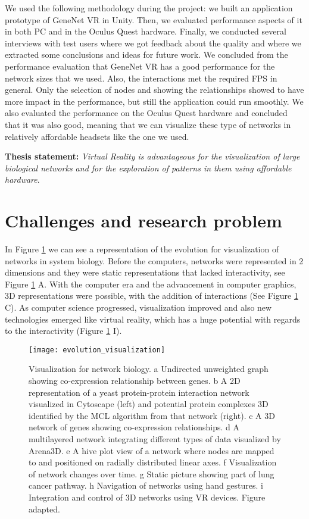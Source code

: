 We used the following methodology during the project: we built an application prototype of GeneNet VR in Unity. Then, we evaluated performance aspects of it in both PC and in the Oculus Quest hardware. Finally, we conducted several interviews with test users where we got feedback about the quality and where we extracted some conclusions and ideas for future work. We concluded from the performance evaluation that GeneNet VR has a good performance for the network sizes that we used. Also, the interactions met the required FPS in general. Only the selection of nodes and showing the relationships showed to have more impact in the performance, but still the application could run smoothly. We also evaluated the performance on the Oculus Quest hardware and concluded that it was also good, meaning that we can visualize these type of networks in relatively affordable headsets like the one we used.

\textbf{Thesis statement: } \emph{Virtual Reality is advantageous for the visualization of large biological networks and for the exploration of patterns in them using affordable hardware}.

\section{Challenges and research problem}
In Figure \ref{fig:network_biology_evolution} we can see a representation of the evolution for visualization of networks in system biology. Before the computers, networks were represented in 2 dimensions and they were static representations that lacked interactivity, see Figure \ref{fig:network_biology_evolution} A. With the computer era and the advancement in computer graphics, 3D representations were possible, with the addition of interactions (See Figure  \ref{fig:network_biology_evolution} C). As computer science progressed, visualization improved and also new technologies emerged like virtual reality, which has a huge potential with regards to the interactivity (Figure \ref{fig:network_biology_evolution} I).

\begin{figure}[h!]
    \newlength{\tempheight}
    \setlength{\tempheight}{15ex}
    \centering%
    \texttt{[image: evolution\_visualization]}
    \caption{Visualization for network biology. a Undirected unweighted graph showing co-expression relationship between genes. b A 2D representation of a yeast protein-protein interaction network visualized in Cytoscape (left) and potential protein complexes 3D identified by the MCL algorithm from that network (right). c A 3D network of genes showing co-expression relationships. d A multilayered network integrating different types of data visualized by Arena3D. e A hive plot view of a network where nodes are mapped to and positioned on radially distributed linear axes. f Visualization of network changes over time. g Static picture showing part of lung cancer pathway. h Navigation of networks using hand gestures. i Integration and control of 3D networks using VR devices. Figure adapted\cite{pavlopoulos_malliarakis_papanikolaou_theodosiou_enright_iliopoulos_2015}.}
    \label{fig:network_biology_evolution}
\end{figure}%

